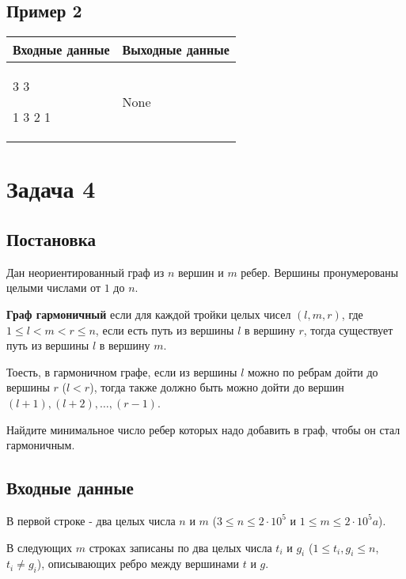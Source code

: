 \documentclass{extarticle}
\begin{document}
\subsection*{Пример 2}
\label{sec:orge96f7c4}

\begin{table}[H]
\begin{center}
\begin{tabular}{|m{4cm}|m{4cm}|}
\hline
Входные данные & Выходные данные \\ \hline
3 3

1 3 2 1
&
None
\\ \hline
\end{tabular}
\end{center}
\end{table}

\pagebreak
\section*{Задача 4}
\label{sec:orgb1f46a6}
\subsection*{Постановка}
\label{sec:orge854c50}

Дан неориентированный граф из \(n\) вершин
и \(m\) ребер.
Вершины пронумерованы целыми числами от \(1\) до \(n\).

\textbf{Граф гармоничный} если для каждой тройки целых чисел \((l,m,r)\), где
\(1 \leq l < m < r \leq n\),
если есть путь из вершины \(l\) в вершину \(r\),
тогда существует путь из вершины \(l\) в вершину \(m\).

Тоесть, в гармоничном графе, если из вершины \(l\)
можно по ребрам дойти до вершины
\(r\) (\(l<r\)), тогда также должно быть можно
дойти до вершин \((l+1),(l+2),\dots,(r−1)\).

Найдите минимальное число ребер которых надо добавить в граф,
чтобы он стал гармоничным.

\subsection*{Входные данные}
\label{sec:org2e05f42}

В первой строке - два целых числа
\(n\) и \(m\) (\(3 \leq n \leq 2 \cdot 10^{5}\) и \(1 \leq m \leq 2 \cdot 10^{5}a\)).

В следующих \(m\) строках записаны по два целых числа
\(t_{i}\) и \(g_{i}\) (\(1 \leq t_{i}, g_{i} \leq n\), \(t_{i} \neq g_{i}\)),
описывающих ребро между вершинами \(t\) и \(g\).
\end{document}

